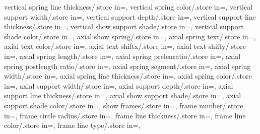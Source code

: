 {  vertical spring line thickness/.store in=\versprlinethk,
  vertical spring color/.store in=\versprcolor,
  vertical support width/.store in=\versuppwidth,
  vertical support depth/.store in=\versuppdepth,
  vertical support line thickness/.store in=\versupplinethk,
  vertical show support shade/.store in=\vershowsuppshade,
  vertical support shade color/.store in=\versuppshadecol,
  axial show spring/.store in=\showaxialspring,
  axial spring text/.store in=\axialspringtext,
  axial text color/.store in=\axialtextcolor,
  axial text shiftx/.store in=\axialtextshiftx,
  axial text shifty/.store in=\axialtextshifty,
  axial spring length/.store in=\axialspringlength,
  axial spring prelenratio/.store in=\axialspringprelenratio,
  axial spring postlength ratio/.store in=\axialspringpostlenratio,
  axial spring segment/.store in=\axialspringsegm,
  axial spring width/.store in=\axialspringwidth,
  axial spring line thickness/.store in=\axialspringlinethk,
  axial spring color/.store in=\axialspringcolor,
  axial support width/.store in=\axialsuppwidth,
  axial support depth/.store in=\axialsuppdepth,
  axial support line thickness/.store in=\axialsupplinethk,
  axial show support shade/.store in=\axialshowsuppshade,
  axial support shade color/.store in=\axialsuppshadecol,
  show frames/.store in=\showframes,
  frame number/.store in=\framenumber,
  frame circle radius/.store in=\framecirclerad,
  frame line thickness/.store in=\framelinethk,
  frame line color/.store in=\framelinecolor,
  frame line type/.store in=\framelinetype,}

